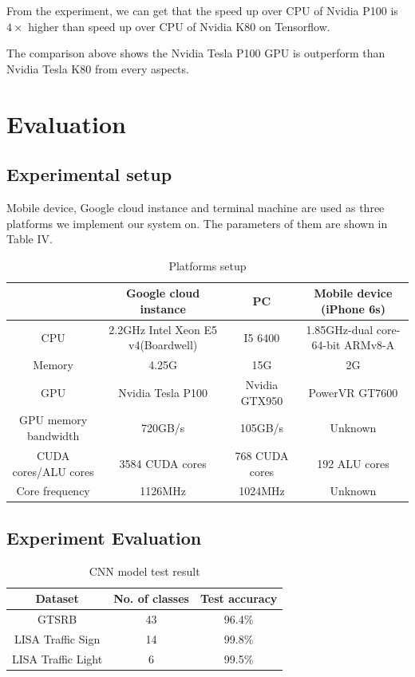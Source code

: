 \documentclass[conference]{IEEEtran}
\begin{document}
From the experiment, we can get that the speed up over CPU of Nvidia P100 is $4 \times$ higher than speed up over CPU of Nvidia K80 on Tensorflow. 

The comparison above shows the Nvidia Tesla P100 GPU is outperform than Nvidia Tesla K80 from every aspects. 

\section{Evaluation}

\subsection{Experimental setup}

Mobile device, Google cloud instance and terminal machine are used as three platforms we implement our system on. The parameters of them are shown in Table IV.  


\begin{table}
\caption{Platforms setup}
\centering
\begin{tabular}{|c|c|c|c|}
\hline
\textbf{} & \textbf{Google cloud instance}&\textbf{PC}&
\textbf{Mobile device (iPhone 6s)}\\
\hline
CPU & 2.2GHz Intel Xeon E5 v4(Boardwell) & I5 6400 & 1.85GHz-dual core-64-bit ARMv8-A \\
\hline
Memory & 4.25G & 15G & 2G\\
\hline
GPU & Nvidia Tesla P100   & Nvidia GTX950 & PowerVR GT7600 \\
\hline
GPU memory bandwidth & 720GB/s & 105GB/s & Unknown \\ 
\hline
CUDA cores/ALU cores & 3584 CUDA cores & 768 CUDA cores & 192 ALU cores \\
\hline
Core frequency & 1126MHz & 1024MHz & Unknown \\
\hline
\end{tabular}
\end{table}


\subsection{Experiment Evaluation}

\begin{table}[!htb]
\caption{CNN model test result}
\begin{center}
\begin{tabular}{|c|c|c|}
\hline
\textbf{Dataset} & \textbf{No. of classes}& \textbf{Test accuracy} \\
\hline
GTSRB & 43 & 96.4\% \\
\hline
LISA Traffic Sign & 14 & 99.8\% \\
\hline
LISA Traffic Light& 6 & 99.5\% \\
\hline
\end{tabular}
\label{tab3}
\end{center}
\end{table}
\end{document}
